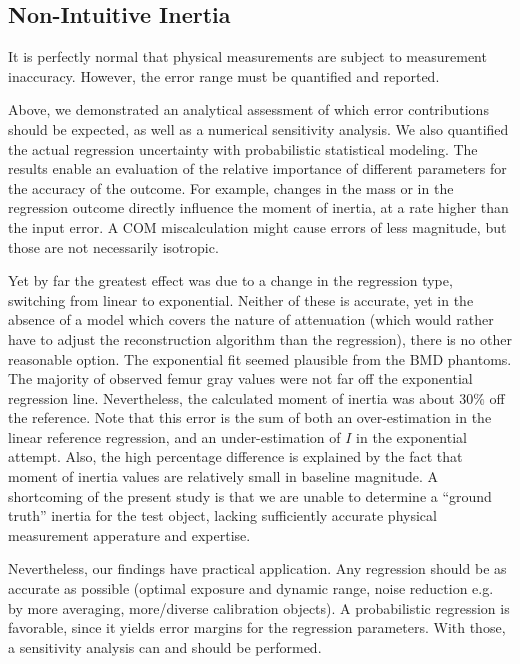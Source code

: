\subsection{Non-Intuitive Inertia}
\label{sec:org06bff2f}
It is perfectly normal that physical measurements are subject to measurement inaccuracy.
However, the error range must be quantified and reported.

Above, we demonstrated an analytical assessment of which error contributions should be expected, as well as a numerical sensitivity analysis.
We also quantified the actual regression uncertainty with probabilistic statistical modeling.
The results enable an evaluation of the relative importance of different parameters for the accuracy of the outcome.
For example, changes in the mass or in the regression outcome directly influence the moment of inertia, at a rate higher than the input error.
A COM miscalculation might cause errors of less magnitude, but those are not necessarily isotropic.


Yet by far the greatest effect was due to a change in the regression type, switching from linear to exponential.
Neither of these is accurate, yet in the absence of a model which covers the nature of attenuation (which would rather have to adjust the reconstruction algorithm than the regression), there is no other reasonable option.
The exponential fit seemed plausible from the BMD phantoms.
The majority of observed femur gray values were not far off the exponential regression line.
Nevertheless, the calculated moment of inertia was about \(30\%\) off the reference.
Note that this error is the sum of both an over-estimation in the linear reference regression, and an under-estimation of \(I\) in the exponential attempt.
Also, the high percentage difference is explained by the fact that moment of inertia values are relatively small in baseline magnitude.
A shortcoming of the present study is that we are unable to determine a ``ground truth'' inertia for the test object, lacking sufficiently accurate physical measurement apperature and expertise.


Nevertheless, our findings have practical application.
Any regression should be as accurate as possible (optimal exposure and dynamic range, noise reduction e.g. by more averaging, more/diverse calibration objects).
A probabilistic regression is favorable, since it yields error margins for the regression parameters.
With those, a sensitivity analysis can and should be performed.


